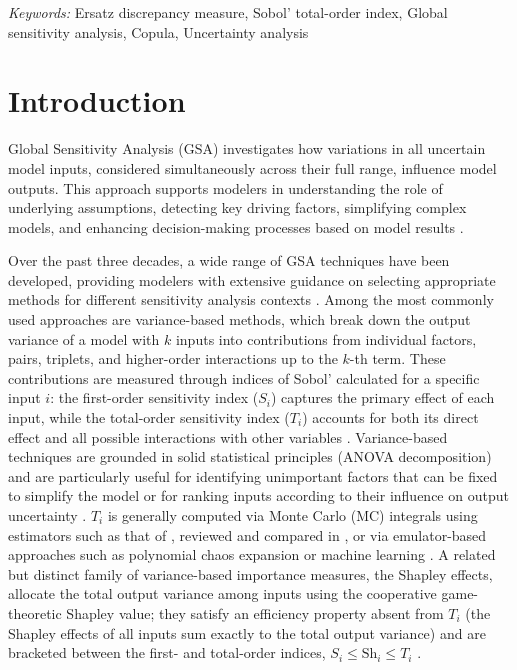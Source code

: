 \documentclass[12pt]{article}
\begin{document}
\noindent
{\it Keywords:} Ersatz discrepancy measure, Sobol' total-order index, Global sensitivity analysis, Copula, Uncertainty analysis
\vfill

\newpage
{}

\section{Introduction}

Global Sensitivity Analysis (GSA) investigates how variations in all uncertain model inputs, considered simultaneously across their full range, influence model outputs. This approach supports modelers in understanding the role of underlying assumptions, detecting key driving factors, simplifying complex models, and enhancing decision-making processes based on model results \citep{Saltelli2008}.

Over the past three decades, a wide range of GSA techniques have been developed, providing modelers with extensive guidance on selecting appropriate methods for different sensitivity analysis contexts \citep{becker_metafunctions_2020, puy_comprehensive_2022, razavi2021future, sheikholeslami2021viscous}. Among the most commonly used approaches are variance-based methods, which break down the output variance of a model with $k$ inputs into contributions from individual factors, pairs, triplets, and higher-order interactions up to the $k$-th term. These contributions are measured through indices of Sobol' calculated for a specific input $i$: the first-order sensitivity index ($S_i$) captures the primary effect of each input, while the total-order sensitivity index ($T_i$) accounts for both its direct effect and all possible interactions with other variables \citep{homma1996importance}. Variance-based techniques are grounded in solid statistical principles (ANOVA decomposition) and are particularly useful for identifying unimportant factors that can be fixed to simplify the model or for ranking inputs according to their influence on output uncertainty \citep{Saltelli2008}. $T_i$ is generally computed via Monte Carlo (MC) integrals using estimators such as that of \citet{jansen1999}, reviewed and compared in \citet{saltelli_variance_2010}, or via emulator-based approaches such as polynomial chaos expansion \citep{sudret_global_2008} or machine learning \citep{antoniadis2021random}. A related but distinct family of variance-based importance measures, the Shapley effects, allocate the total output variance among inputs using the cooperative game-theoretic Shapley value; they satisfy an efficiency property absent from $T_i$ (the Shapley effects of all inputs sum exactly to the total output variance) and are bracketed between the first- and total-order indices, $S_i \le \mathrm{Sh}_i \le T_i$ \citep{owen2014}.
\end{document}
